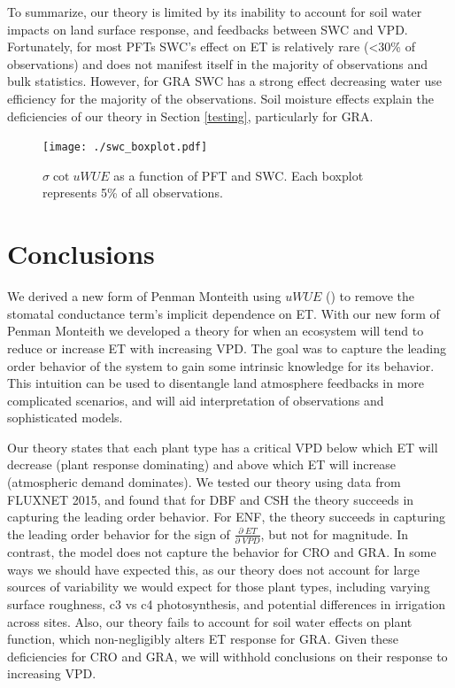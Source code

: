 \documentclass[draft,linenumbers]{agujournal}
\begin{document}
To summarize, our theory is limited by its inability to account for soil water impacts on land surface response, and feedbacks between SWC and VPD. Fortunately, for most PFTs SWC's effect on ET is relatively rare (<30\% of observations) and does not manifest itself in the majority of observations and bulk statistics. However, for GRA SWC has a strong effect decreasing water use efficiency for the majority of the observations. Soil moisture effects explain the deficiencies of our theory in Section \ref{testing}, particularly for GRA.

\begin{figure}[h]
\centering
\texttt{[image: ./swc\_boxplot.pdf]}
\caption{$\sigma \cot uWUE$ as a function of PFT and SWC. Each boxplot represents 5\% of all observations.}
\label{swc}
\end{figure}

\section{Conclusions} 

We derived a new form of Penman Monteith using $uWUE$ (\cite{Zhou_2015}) to remove the stomatal conductance term's implicit dependence on ET. With our new form of Penman Monteith we developed a theory for when an ecosystem will tend to reduce or increase ET with increasing VPD. The goal was to capture the leading order behavior of the system to gain some intrinsic knowledge for its behavior. This intuition can be used to disentangle land atmosphere feedbacks in more complicated scenarios, and will aid interpretation of observations and sophisticated models.

Our theory states that each plant type has a critical VPD below which ET will decrease (plant response dominating) and above which ET will increase (atmospheric demand dominates). We tested our theory using data from FLUXNET 2015, and found that for DBF and CSH the theory succeeds in capturing the leading order behavior. For ENF, the theory succeeds in capturing the leading order behavior for the sign of $\frac{\partial \; ET}{\partial \; VPD}$, but not for magnitude. In contrast, the model does not capture the behavior for CRO and GRA. In some ways we should have expected this, as our theory does not account for large sources of variability we would expect for those plant types, including varying surface roughness, c3 vs c4 photosynthesis, and potential differences in irrigation across sites. Also, our theory fails to account for soil water effects on plant function, which non-negligibly alters ET response for GRA. Given these deficiencies for CRO and GRA, we will withhold conclusions on their response to increasing VPD.
\end{document}
